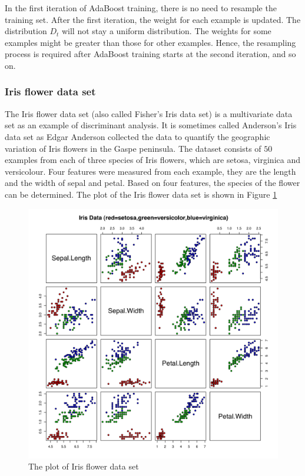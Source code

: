 In the first iteration of AdaBoost training, there is no need to resample the training set. After the first iteration, the weight for each example is updated. The distribution $D_{t}$ will not stay a uniform distribution. The weights for some examples might be greater than those for other examples. Hence, the  resampling process is required after AdaBoost training starts at the second iteration, and so on.

\subsubsection{Iris flower data set}
\label{sec:iris}
The Iris flower data set (also called Fisher's Iris data set) \cite{Anderson1935,Fisher1936} is a multivariate data set as an example of discriminant analysis. It is sometimes called Anderson's Iris data set as Edgar Anderson collected the data to quantify the geographic variation of Iris flowers in the Gaspe peninsula. The dataset consists of $50$ examples from each of three species of Iris flowers, which are setosa, virginica and versicolour. Four features were measured from each example, they are the length and the width of sepal and petal. 
Based on four features, the species of the flower can be determined.  The plot of the Iris flower data set is shown in \mbox{Figure} \ref{fig:irisdata}
\begin{figure}
 \includegraphics[width=\textwidth]{ch4/figures/Anderson's_Iris_data_set.png}
\caption{The plot of Iris flower data set}
\label{fig:irisdata}
\end{figure} 


